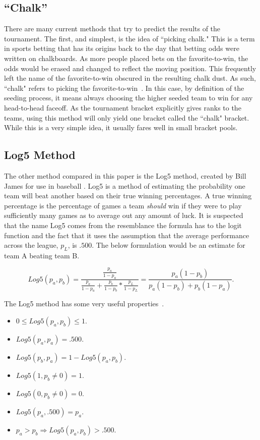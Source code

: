 \documentclass[5p, preprint]{elsarticle}
\begin{document}
\subsection{``Chalk''}

There are many current methods that try to predict the results of the tournament. The first, and simplest, is the idea of ``picking chalk." This is a term in sports betting that has its origins back to the day that betting odds were written on chalkboards. As more people placed bets on the favorite-to-win, the odds would be erased and changed to  reflect the moving position. This frequently left the name of the favorite-to-win obscured in the resulting chalk dust. As such, ``chalk" refers to picking the favorite-to-win~\cite{Tracy2013}. In this case, by definition of the seeding process,  it means always choosing the higher seeded team to win for any head-to-head faceoff.  As the tournament bracket explicitly gives ranks to the teams, using this method will only yield one bracket called the ``chalk" bracket. While this is a very simple idea, it usually fares well in small bracket pools. 

\vspace*{-.1in}

\subsection{Log5 Method}

The other method compared in this paper is the Log5 method, created by Bill James for use in baseball \cite{James1981}.  Log5 is a method of estimating the probability one team will beat another based on their true winning percentages. A true winning percentage is the percentage of games a team \emph{should} win if they were to play sufficiently many games as to average out any amount of luck. It is suspected that the name Log5 comes from the resemblance the formula has to the logit function and the fact that it uses the assumption that the average performance across the league, $p_L$, is $.500$. The below formulation would be an estimate for team A beating team B.

{\small
\[
Log5(p_a, p_b) = \frac{\frac{p_a}{1-p_a}}{\frac{p_a}{1-p_a} + \frac{p_b}{1-p_b} * \frac{p_L}{1-p_L}} = \frac{p_a (1 - p_b)}{p_a (1 - p_b) + p_b (1 - p_a)}.
\]
}

The Log5 method has some very useful properties~\cite{Miller2008, Hammond2014}. 

\begin{itemize}
\item $ 0 \leq Log5(p_a, p_b) \leq 1$.
\item $Log5(p_a, p_a) = .500$.
\item $Log5(p_b, p_a) = 1 - Log5(p_a, p_b)$.
\item $Log5(1, p_b \neq 0) = 1$.
\item $Log5(0, p_b \neq 0) = 0$.
\item $Log5(p_a, .500) = p_a$.
\item $p_a > p_b \Rightarrow Log5(p_a, p_b) > .500$.
\end{itemize}
\end{document}
